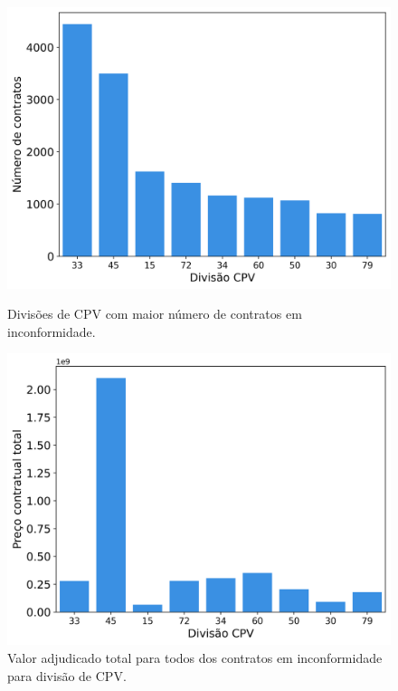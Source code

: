 \begin{figure}[H]
	\centering
	\begin{minipage}{.48\linewidth}
		\includegraphics[width=\linewidth]{imagens/r018/main_cpvs.png}
		\caption{Divisões de CPV com maior número de contratos em inconformidade.}
	\end{minipage}
	\hfill
	\begin{minipage}{.49\linewidth}
		\includegraphics[width=\linewidth]{imagens/r018/prices.png}
		\caption{Valor adjudicado total para todos dos contratos em inconformidade para divisão de CPV.}
	\end{minipage}
\end{figure}










